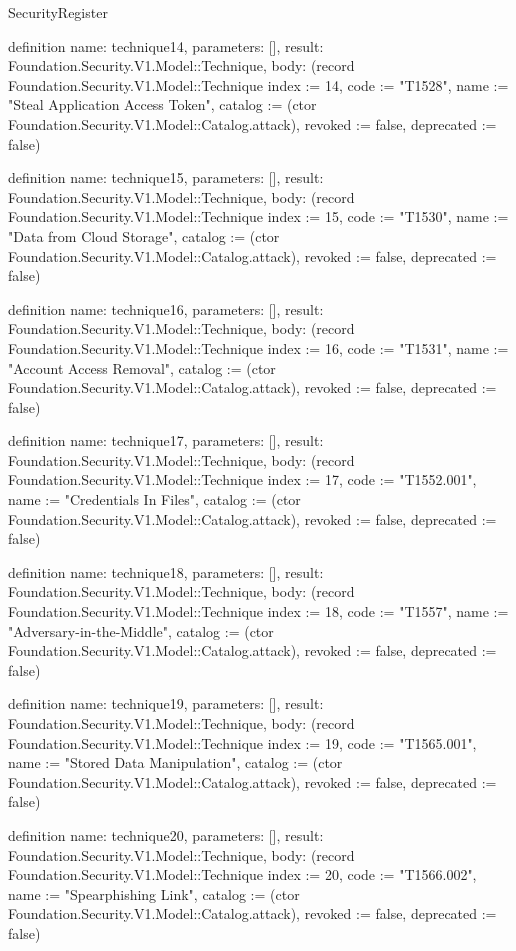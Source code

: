 \begin{lexlean}{SecurityRegister}
\begin{semanticmodule}
definition{
  name: technique14,
  parameters: [],
  result: Foundation.Security.V1.Model::Technique,
  body: (record Foundation.Security.V1.Model::Technique {index := 14, code := "T1528", name := "Steal Application Access Token", catalog := (ctor Foundation.Security.V1.Model::Catalog.attack), revoked := false, deprecated := false})
}

definition{
  name: technique15,
  parameters: [],
  result: Foundation.Security.V1.Model::Technique,
  body: (record Foundation.Security.V1.Model::Technique {index := 15, code := "T1530", name := "Data from Cloud Storage", catalog := (ctor Foundation.Security.V1.Model::Catalog.attack), revoked := false, deprecated := false})
}

definition{
  name: technique16,
  parameters: [],
  result: Foundation.Security.V1.Model::Technique,
  body: (record Foundation.Security.V1.Model::Technique {index := 16, code := "T1531", name := "Account Access Removal", catalog := (ctor Foundation.Security.V1.Model::Catalog.attack), revoked := false, deprecated := false})
}

definition{
  name: technique17,
  parameters: [],
  result: Foundation.Security.V1.Model::Technique,
  body: (record Foundation.Security.V1.Model::Technique {index := 17, code := "T1552.001", name := "Credentials In Files", catalog := (ctor Foundation.Security.V1.Model::Catalog.attack), revoked := false, deprecated := false})
}

definition{
  name: technique18,
  parameters: [],
  result: Foundation.Security.V1.Model::Technique,
  body: (record Foundation.Security.V1.Model::Technique {index := 18, code := "T1557", name := "Adversary-in-the-Middle", catalog := (ctor Foundation.Security.V1.Model::Catalog.attack), revoked := false, deprecated := false})
}

definition{
  name: technique19,
  parameters: [],
  result: Foundation.Security.V1.Model::Technique,
  body: (record Foundation.Security.V1.Model::Technique {index := 19, code := "T1565.001", name := "Stored Data Manipulation", catalog := (ctor Foundation.Security.V1.Model::Catalog.attack), revoked := false, deprecated := false})
}

definition{
  name: technique20,
  parameters: [],
  result: Foundation.Security.V1.Model::Technique,
  body: (record Foundation.Security.V1.Model::Technique {index := 20, code := "T1566.002", name := "Spearphishing Link", catalog := (ctor Foundation.Security.V1.Model::Catalog.attack), revoked := false, deprecated := false})
}


\end{semanticmodule}
\end{lexlean}
